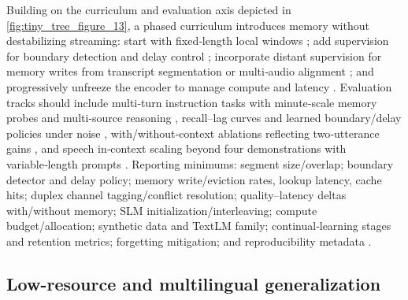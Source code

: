 Building on the curriculum and evaluation axis depicted in \autoref{fig:tiny_tree_figure_13}, a phased curriculum introduces memory without destabilizing streaming: start with fixed‑length local windows \cite{hsu2024exploringcontextlearningtextlessspeechla}; add supervision for boundary detection and delay control \cite{guo2025streamuniachievingstreamingspeechtransla}; incorporate distant supervision for memory writes from transcript segmentation or multi‑audio alignment \cite{huang2025dynamicsuperbphase2collaborativelyexpand}; and progressively unfreeze the encoder to manage compute and latency \cite{nguyen2025qwenvsgemmaintegrationwhispercomparative}. Evaluation tracks should include multi‑turn instruction tasks with minute‑scale memory probes and multi‑source reasoning \cite{huang2025dynamicsuperbphase2collaborativelyexpand}, recall–lag curves and learned boundary/delay policies under noise \cite{guo2025streamuniachievingstreamingspeechtransla}, with/without‑context ablations reflecting two‑utterance gains \cite{li2025seewossubmissionmlcslmlessonslearnedspee}, and speech in‑context scaling beyond four demonstrations with variable‑length prompts \cite{hsu2024exploringcontextlearningtextlessspeechla}. Reporting minimums: segment size/overlap; boundary detector and delay policy; memory write/eviction rates, lookup latency, cache hits; duplex channel tagging/conflict resolution; quality–latency deltas with/without memory; SLM initialization/interleaving; compute budget/allocation; synthetic data and TextLM family; continual‑learning stages and retention metrics; forgetting mitigation; and reproducibility metadata \cite{maimon2025scalinganalysisinterleavedspeechtextlang,hsiao2025analyzingmitigationstrategiescatastrophi,chen2023reducingbarriersselfsupervisedlearninghu}.

\subsection{Low-resource and multilingual generalization} \label{subsec:Low-resource and multilingual generalization}

